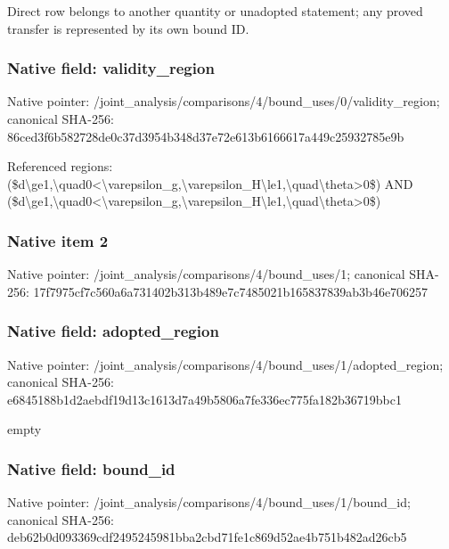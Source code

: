 \documentclass[10pt,a4paper]{article}
\begin{document}
\begingroup\raggedright\sloppy Direct row belongs to another quantity or unadopted statement;\allowbreak{} any proved transfer is represented by its own bound ID.\par\endgroup

\subsubsection{Native field: validity\_\allowbreak{}region}
Native pointer: /joint\_\allowbreak{}analysis/comparisons/4/bound\_\allowbreak{}uses/0/validity\_\allowbreak{}region; canonical SHA-256: 86ced3f6b582728de0c37d3954b348d37e72e613b6166617a449c25932785e9b

\begingroup\raggedright\sloppy Referenced regions:\allowbreak{} (\$d\textbackslash{}ge1,\allowbreak{}\textbackslash{}quad0<\textbackslash{}varepsilon\_\allowbreak{}g,\allowbreak{}\textbackslash{}varepsilon\_\allowbreak{}H\textbackslash{}le1,\allowbreak{}\textbackslash{}quad\textbackslash{}theta>0\$) AND (\$d\textbackslash{}ge1,\allowbreak{}\textbackslash{}quad0<\textbackslash{}varepsilon\_\allowbreak{}g,\allowbreak{}\textbackslash{}varepsilon\_\allowbreak{}H\textbackslash{}le1,\allowbreak{}\textbackslash{}quad\textbackslash{}theta>0\$)\par\endgroup

\subsubsection{Native item 2}
Native pointer: /joint\_\allowbreak{}analysis/comparisons/4/bound\_\allowbreak{}uses/1; canonical SHA-256: 17f7975cf7c560a6a731402b313b489e7c7485021b165837839ab3b46e706257

\subsubsection{Native field: adopted\_\allowbreak{}region}
Native pointer: /joint\_\allowbreak{}analysis/comparisons/4/bound\_\allowbreak{}uses/1/adopted\_\allowbreak{}region; canonical SHA-256: e6845188b1d2aebdf19d13c1613d7a49b5806a7fe336ec775fa182b36719bbc1

\begingroup\raggedright\sloppy empty\par\endgroup

\subsubsection{Native field: bound\_\allowbreak{}id}
Native pointer: /joint\_\allowbreak{}analysis/comparisons/4/bound\_\allowbreak{}uses/1/bound\_\allowbreak{}id; canonical SHA-256: deb62b0d093369cdf2495245981bba2cbd71fe1c869d52ae4b751b482ad26cb5
\end{document}
